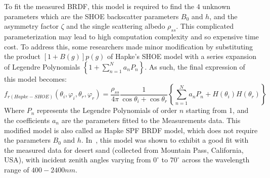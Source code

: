 To fit the measured BRDF, this model is required to find the $4$ unknown parameters which are the SHOE backscatter parameters $B_0$ and $h$, and  the asymmetry factor $\zeta$ and the single scattering albedo $\rho_{ss}$.
This complicated parameterization may lead to high computation complexity and so expensive time cost.
To address this, some researchers made minor modification by substituting the product $\left[1 + B(g)\right] p(g)$ of Hapke's SHOE model with a series expansion of Legendre Polynomials $\left\{1 + \sum_{n=1}^{N} a_n P_n\right\}$.
As such, the final expression of this model becomes:
\begin{equation}
    f_{r(Hapke-SHOE)}(\theta_i, \varphi_i, \theta_r, \varphi_r) = \frac{\rho_{ss}}{4 \pi}%
    \frac{1}{\cos\theta_i + \cos\theta_r}%
    \left\{
    \sum_{n=1}^{N} a_n P_n%
    + H(\theta_i)H(\theta_r)%
    \right\}
\end{equation}
Where $P_n$ represents the Legendre Polynomials of order $n$ starting from 1, and the coefficients $a_n$ are the parameters fitted to the Measurements data.
This modified model is also called as Hapke SPF BRDF model, which does not require the parameters $B_0$ and $h$.
In~\cite{2022_Wise}, this model was shown to exhibit a good fit  with the measured data for desert sand (collected from Mountain Pass, California, USA), with incident zenith angles varying from $0^\circ$ to $70^\circ$ across the wavelength range of $400-2400 nm$.